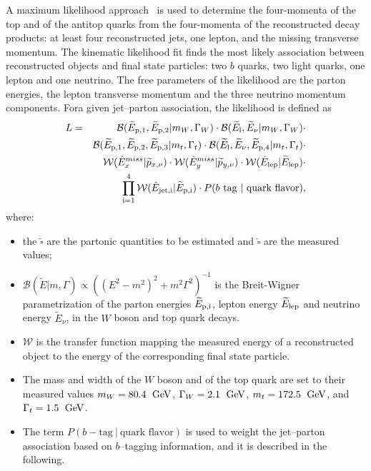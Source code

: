A maximum likelihood approach~\cite{klfitter} is used to determine the
four-momenta of the top and of the antitop quarks from the four-momenta of
the reconstructed decay products: at least four reconstructed jets, one lepton, and the
missing transverse momentum. The kinematic likelihood fit finds the
most likely association between reconstructed objects and \ttbar{} final state particles:
two $b$ quarks, two light quarks, one lepton and one neutrino.
The free parameters of the likelihood are the parton energies, the
lepton transverse momentum and the three neutrino momentum components.
Fora given jet--parton association, the likelihood is defined as
\begin{eqnarray}
L & = & \mathcal{B}(\widetilde{E}_{\rm{p,}1}, \widetilde{E}_{\rm{p,}2} | m_W,  \Gamma_W)
      \cdot \mathcal{B}(\widetilde{E}_{\rm l}, \widetilde{E}_{\nu} | m_W, \Gamma_W) \cdot \nonumber \\
           &   & \mathcal{B}(\widetilde{E}_{\rm{p,}1}, \widetilde{E}_{\rm{p,}2},     \widetilde{E}_{\rm{p,}3} | m_t, \Gamma_t)
                 \cdot \mathcal{B}(\widetilde{E}_{\rm l}, \widetilde{E}_{\nu},    \widetilde{E}_{\rm{p,}4} | m_t, \Gamma_t) \cdot \nonumber \\
           &   & \mathcal{W}( \hat{E}_{x}^{miss}| \widetilde{p}_{x, \nu})
                 \cdot \mathcal{W}(\hat{E}_{y}^{miss} |    \widetilde{p}_{y, \nu})
                 \cdot \mathcal{W}(\hat{E}_{\rm{lep}} | \widetilde{E}_{\rm{lep}}) \cdot \nonumber \\
           &   & \prod_{\rm{i=1}}^4 \mathcal{W}(\hat{E}_{\rm{jet,}i} | \widetilde{E}_{\rm{p,}i})
                 \cdot P(\textrm{$b$ tag} ~| ~\textrm{quark flavor}),
\label{eq:klflikelihood}
\end{eqnarray}
where:
\begin{itemize}
\item the $\widetilde{\square{}}$ are the partonic quantities to be estimated
       and $\hat{\square{}}$ are the measured values;
\item $\mathcal{B}(\widetilde{E}|m,\Gamma)\propto((E^2-m^2)^2+m^2\Gamma^2)^{-1}$ is
  the Breit-Wigner parametrization of the parton energies
  $\widetilde{E}_{\rm{p,}i}$, lepton energy $\widetilde{E}_{\rm{lep}}$
  and neutrino energy $\widetilde{E}_{\nu}$, in the $W$ boson and top quark decays.
\item $\mathcal{W}$ is the transfer function mapping the measured energy
      of a reconstructed object to the energy of the corresponding final state particle.
\item The mass and width of the $W$ boson and of the top quark are set
  to their measured values $m_W = 80.4~\; \mathrm{GeV}{}$, $\Gamma_W = 2.1~\; \mathrm{GeV}{}$, $m_t =
       172.5~\; \mathrm{GeV}{}$, and $\Gamma_t = 1.5~\; \mathrm{GeV}{}$. 
\item The term $P(b-\textrm{tag} ~| ~\textrm{quark flavor})$ is used
  to weight the jet--parton association based on $b$--tagging
  information, and it is described in the following.
\end{itemize}

